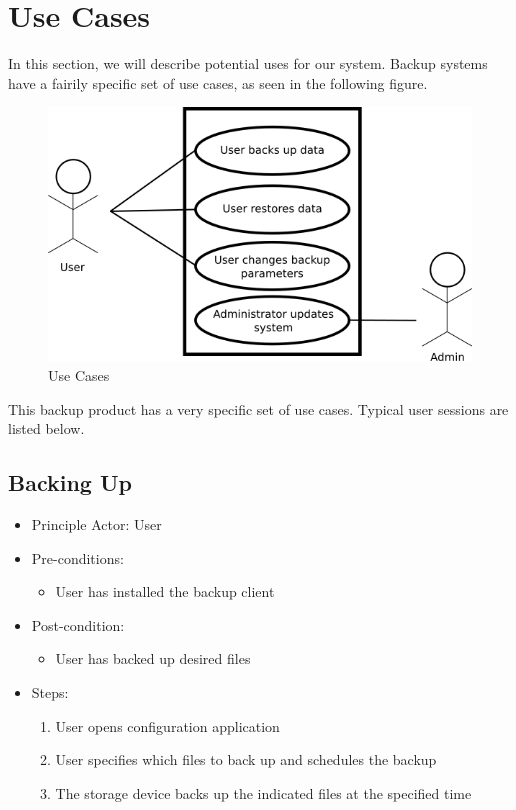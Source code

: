 \chapter{Use Cases}
In this section, we will describe potential uses for our system. Backup systems have a fairily specific set of use cases, as seen in the following figure.

\begin{figure}[h]
\centering\includegraphics[scale=0.5]{images/senior-design-user-model.png}
\caption{Use Cases}
\end{figure}

This backup product has a very specific set of use cases. Typical user sessions are listed below.

\section{Backing Up}
\begin{itemize}
	\item Principle Actor: User
	\item Pre-conditions: 
		\begin{itemize}
			\item User has installed the backup client 
		\end{itemize}
	\item Post-condition:
			\begin{itemize}
				\item User has backed up desired files
			\end{itemize}
	\item Steps:
		\begin{enumerate}
			\item User opens configuration application
			\item User specifies which files to back up and schedules the backup
			\item The storage device backs up the indicated files at the specified time
		\end{enumerate}
\end{itemize}
